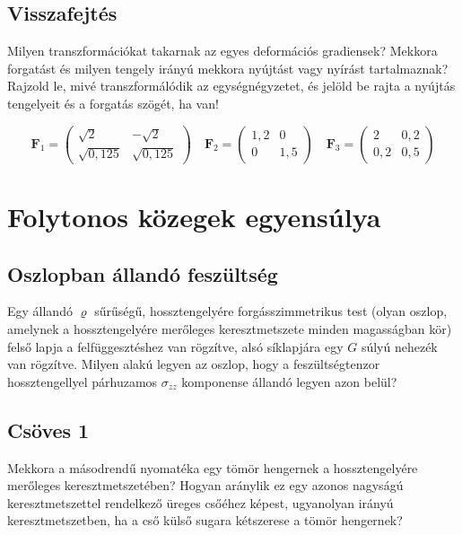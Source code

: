 \documentclass[12pt,a4paper]{scrartcl}
\let\mathbf\bm
\begin{document}
\subsection{Visszafejtés}
Milyen transzformációkat takarnak az egyes deformációs gradiensek? Mekkora forgatást és milyen tengely irányú mekkora nyújtást vagy nyírást tartalmaznak? Rajzold le, mivé transzformálódik az egységnégyzetet, és jelöld be rajta a nyújtás tengelyeit és a forgatás szögét, ha van!

\[{{\mathbf{F}}_1} = \left( {\begin{array}{*{20}{c}}
  {\sqrt 2 }&-{\sqrt 2 } \\ 
  {\sqrt {0{,}125} }&{ \sqrt {0{,}125} } 
\end{array}} \right)\quad {{\mathbf{F}}_2} = \left( {\begin{array}{*{20}{c}}
  {1{,}2}&0 \\ 
  0&{1{,}5} 
\end{array}} \right)\quad {{\mathbf{F}}_3} = \left( {\begin{array}{*{20}{c}}
  2&{0{,}2} \\ 
  {0{,}2}&{0{,}5} 
\end{array}} \right)\]


\section{Folytonos közegek egyensúlya}

\subsection{Oszlopban állandó feszültség}
Egy állandó $\varrho$ sűrűségű, hossztengelyére forgásszimmetrikus test (olyan oszlop, amelynek a hossztengelyére merőleges keresztmetszete minden magasságban kör) felső lapja a felfüggesztéshez van rögzítve, alsó síklapjára egy $G$ súlyú nehezék van rögzítve. Milyen alakú legyen az oszlop, hogy a feszültségtenzor hossztengellyel párhuzamos $\sigma_{zz}$ komponense állandó legyen azon belül?

\subsection{Csöves 1}
Mekkora a másodrendű nyomatéka egy tömör hengernek a hossztengelyére merőleges keresztmetszetében? Hogyan aránylik ez egy azonos nagyságú keresztmetszettel rendelkező üreges csőéhez képest, ugyanolyan irányú keresztmetszetben, ha a cső külső sugara kétszerese a tömör hengernek?
\end{document}
